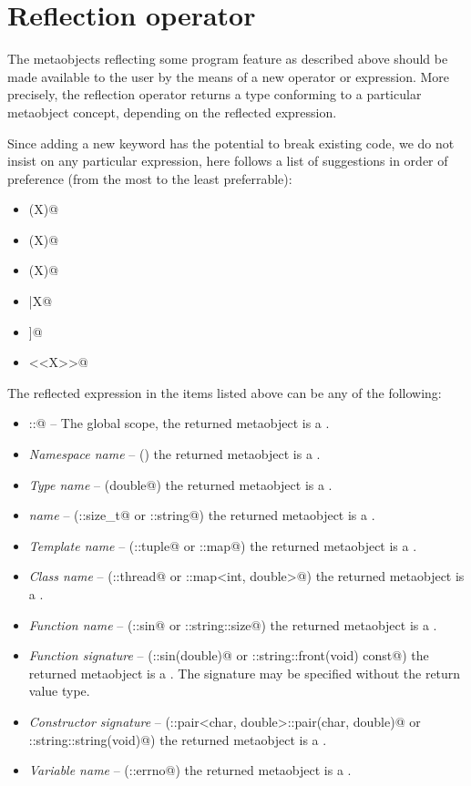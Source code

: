 \section{Reflection operator}

The metaobjects reflecting some program feature \verb@X@ as
described above should be made available to the user by
the means of a new operator or expression.
More precisely, the reflection operator returns a type conforming to a particular
metaobject concept, depending on the reflected expression.

Since adding a new keyword has the potential to break existing code,
we do not insist on any particular expression, here follows a list of suggestions
in order of preference (from the most to the least preferrable):

\begin{itemize}
\item{\verb@mirrored(X)@}
\item{\verb@reflected(X)@}
\item{\verb@reflexpr(X)@}
\item{\verb@|X@}
\item{\verb@[[X]]@}
\item{\verb@<<X>>@}
\end{itemize}

The reflected expression \verb@X@ in the items listed above can be any of the following:

\begin{itemize}
\item{\verb@::@} -- The global scope, the returned metaobject is a {}.
\item{{\em Namespace name}} -- (\verb@std@) the returned metaobject is a {}.
\item{{\em Type name}} -- (\verb@long double@) the returned metaobject is a {}.
\item{{\em \verb@typedef@ name}} -- (\verb@std::size_t@ or \verb@std::string@)
     the returned metaobject is a {}.
\item{{\em Template name}} -- (\verb@std::tuple@ or \verb@std::map@)
     the returned metaobject is a {}.
\item{{\em Class name}} -- (\verb@std::thread@ or \verb@std::map<int, double>@)
     the returned metaobject is a {}.
\item{{\em Function name}} -- (\verb@std::sin@ or \verb@std::string::size@) the returned metaobject
     is a {}.
\item{{\em Function signature}} -- (\verb@std::sin(double)@ or \verb@std::string::front(void) const@)
     the returned metaobject is a {}. The signature may be specified without the
     return value type.
\item{{\em Constructor signature}} -- (\verb@std::pair<char, double>::pair(char, double)@
     or \verb@std::string::string(void)@) the returned metaobject is a {}.
\item{{\em Variable name}} -- (\verb@std::errno@) the returned metaobject is a {}.
\end{itemize}

